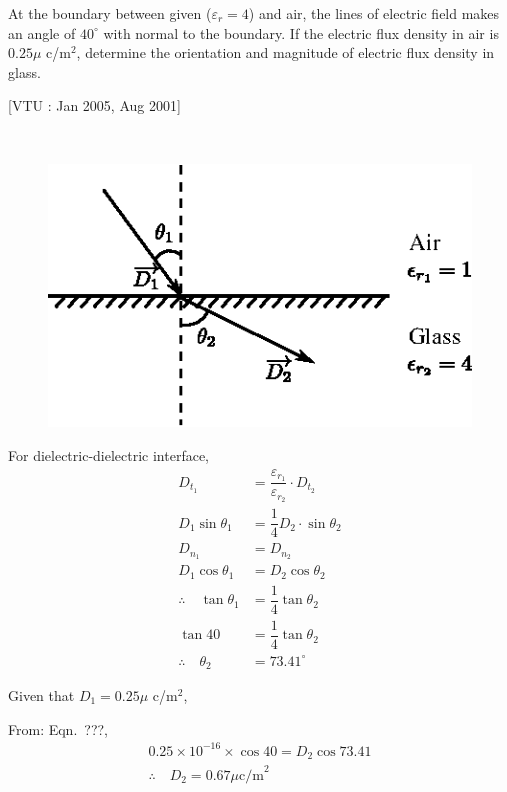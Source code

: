 \begin{problem}
At the boundary between given ($\varepsilon_{r} = 4$) and air, the lines of electric field makes an angle of $40^{\circ}$ with normal to the boundary. If the electric flux density in air is $0.25 \mu$ c/m$^{2}$, determine the orientation and magnitude of electric flux density in glass. 

\hfill [VTU : Jan 2005, Aug 2001]
\end{problem}

\begin{solution}
~

\begin{figure}[H]
\centering
\includegraphics[scale=1.1]{images/fig4.eps}\label{chap27-fig4}
\end{figure}

For dielectric-dielectric interface,
\begin{align*}
D_{t_{1}} & = \dfrac{\varepsilon_{r_{1}}}{\varepsilon_{r_{2}}} \cdot D_{t_{2}}\\
D_{1} \sin \theta_{1} & = \dfrac{1}{4} D_{2} \cdot \sin \theta_{2}\\
D_{n_{1}} & = D_{n_{2}}\\
D_{1} \cos \theta_{1} & = D_{2} \cos \theta_{2}\\
\therefore\quad \tan \theta_{1} & = \dfrac{1}{4} \tan \theta_{2}\\
\tan 40 & = \dfrac{1}{4} \tan \theta_{2}\\
\therefore\quad \theta_{2} & = 73.41^{\circ}
\end{align*}

Given that $D_{1} = 0.25\mu$ c/m$^{2}$,

From: Eqn.~???, 
\begin{gather*}
0.25\times 10^{-16} \times \cos 40 = D_{2} \cos 73.41\\
\therefore\quad D_{2} = 0.67\mu \text{c/m}^{2}
\end{gather*}
\end{solution}

